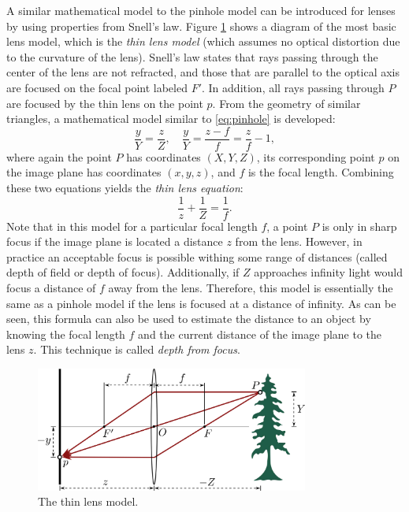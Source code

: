 A similar mathematical model to the pinhole model can be introduced for lenses by using properties from Snell's law. Figure \ref{fig:Lens} shows a diagram of the most basic lens model, which is the \textit{thin lens model} (which assumes no optical distortion due to the curvature of the lens). Snell's law states that rays passing through the center of the lens are not refracted, and those that are parallel to the optical axis are focused on the focal point labeled $F'$. In addition, all rays passing through $P$ are focused by the thin lens on the point $p$. From the geometry of similar triangles, a mathematical model similar to \eqref{eq:pinhole} is developed:
\begin{equation}
    \frac{y}{Y}=\frac{z}{Z}, \quad \frac{y}{Y}=\frac{z-f}{f}  = \frac{z}{f} -1,
\end{equation}
where again the point $P$ has coordinates $(X,Y,Z)$, its corresponding point $p$ on the image plane has coordinates $(x,y,z)$, and $f$ is the focal length.
Combining these two equations yields the \textit{thin lens equation}:
\begin{equation} \label{eq:thinlens}
    \frac{1}{z}+\frac{1}{Z}=\frac{1}{f}.
\end{equation}
Note that in this model for a particular focal length $f$, a point $P$ is only in sharp focus if the image plane is located a distance $z$ from the lens. However, in practice an acceptable focus is possible withing some range of distances (called depth of field or depth of focus). Additionally, if $Z$ approaches infinity light would focus a distance of $f$ away from the lens. Therefore, this model is essentially the same as a pinhole model if the lens is focused at a distance of infinity.
As can be seen, this formula can also be used to estimate the distance to an object by knowing the focal length $f$ and the current distance of the image plane to the lens $z$. This technique is called \textit{depth from focus}. 

\begin{figure}[ht]
\centering
\includegraphics[width=0.8\textwidth]{tex/figs/ch07_figs/thinlens.png}
\caption{The thin lens model.}
\label{fig:Lens}
\end{figure}
